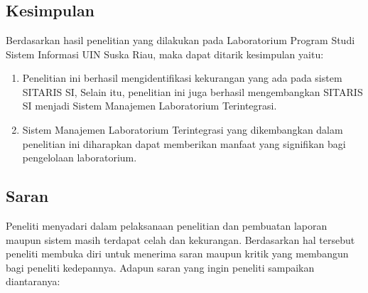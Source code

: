 %
%
%
%


\chapter{\babEnam}
\section{Kesimpulan}
Berdasarkan hasil penelitian yang dilakukan pada Laboratorium Program Studi Sistem Informasi UIN Suska Riau, maka dapat ditarik kesimpulan yaitu:

\begin{enumerate}
	\item Penelitian ini berhasil mengidentifikasi kekurangan yang ada pada sistem SITARIS SI, Selain itu, penelitian ini juga berhasil mengembangkan SITARIS SI menjadi Sistem Manajemen Laboratorium Terintegrasi.
	\item Sistem Manajemen Laboratorium Terintegrasi yang dikembangkan dalam penelitian ini diharapkan dapat memberikan manfaat yang signifikan bagi pengelolaan laboratorium.
\end{enumerate}

\section{Saran}
Peneliti menyadari dalam pelaksanaan penelitian dan pembuatan laporan maupun sistem masih terdapat celah dan kekurangan. Berdasarkan hal tersebut peneliti membuka diri untuk menerima saran maupun kritik yang membangun bagi peneliti kedepannya. Adapun saran yang ingin peneliti sampaikan diantaranya:


